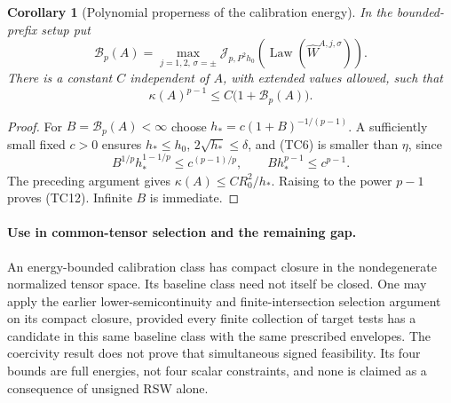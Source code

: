 \documentclass[11pt]{article}
\newtheorem{corollary}[theorem]{Corollary}
\theoremstyle{definition}\newtheorem{definition}[theorem]{Definition}
\theoremstyle{remark}\newtheorem{remark}[theorem]{Remark}
\begin{document}
\begin{corollary}[Polynomial properness of the calibration energy]
\label{cor:polynomial-affine-coercivity}
In the bounded-prefix setup put
\[
 \mathcal B_p(A)=\max_{j=1,2,\,\sigma=\pm}
   \mathcal J_{p,P^2h_0}
       (\operatorname{Law}(\widehat W^{A,j,\sigma})).
\]
There is a constant $C$ independent of $A$, with extended values
allowed, such that
\[
 \kappa(A)^{p-1}\le C\bigl(1+\mathcal B_p(A)\bigr).
 \tag{TC12}
\]
\end{corollary}
\begin{proof}
For $B=\mathcal B_p(A)<\infty$ choose
$h_*=c(1+B)^{-1/(p-1)}$. A sufficiently small fixed $c>0$ ensures
$h_*\le h_0$, $2\sqrt{h_*}\le\delta$, and (TC6) is smaller than
$\eta$, since
\[
 B^{1/p}h_*^{1-1/p}\le c^{(p-1)/p},\qquad
 Bh_*^{p-1}\le c^{p-1}.
\]
The preceding argument gives $\kappa(A)\le CR_0^2/h_*$. Raising
to the power $p-1$ proves (TC12). Infinite $B$ is immediate.
\end{proof}

\paragraph{Use in common-tensor selection and the remaining gap.}
An energy-bounded calibration class has compact closure in the
nondegenerate normalized tensor space. Its baseline class need not
itself be closed. One may apply the earlier lower-semicontinuity and
finite-intersection selection argument on its compact closure, provided
every finite collection of target tests has a candidate in this same
baseline class with the same prescribed envelopes. The coercivity
result does not prove that simultaneous signed feasibility. Its four
bounds are full energies, not four scalar constraints, and none is
claimed as a consequence of unsigned RSW alone.



\end{document}
